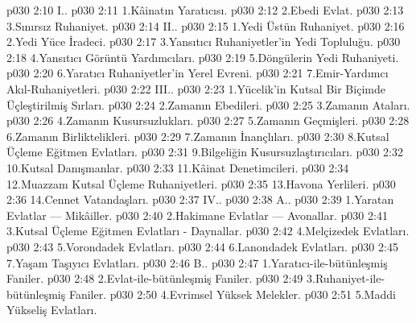 \vs p030 2:10 I.\bibnobreakspace {}.
\vs p030 2:11 1.\bibnobreakspace Kâinatın Yaratıcısı.
\vs p030 2:12 2.\bibnobreakspace Ebedi Evlat.
\vs p030 2:13 3.\bibnobreakspace Sınırsız Ruhaniyet.
\vs p030 2:14 II.\bibnobreakspace {}.
\vs p030 2:15 1.\bibnobreakspace Yedi Üstün Ruhaniyet.
\vs p030 2:16 2.\bibnobreakspace Yedi Yüce İradeci.
\vs p030 2:17 3.\bibnobreakspace Yansıtıcı Ruhaniyetler’in Yedi Topluluğu.
\vs p030 2:18 4.\bibnobreakspace Yansıtıcı Görüntü Yardımcıları.
\vs p030 2:19 5.\bibnobreakspace Döngülerin Yedi Ruhaniyeti.
\vs p030 2:20 6.\bibnobreakspace Yaratıcı Ruhaniyetler’in Yerel Evreni.
\vs p030 2:21 7.\bibnobreakspace Emir\hyp{}Yardımcı Akıl\hyp{}Ruhaniyetleri.
\vs p030 2:22 III.\bibnobreakspace {}.
\vs p030 2:23 1.\bibnobreakspace Yücelik’in Kutsal Bir Biçimde Üçleştirilmiş Sırları.
\vs p030 2:24 2.\bibnobreakspace Zamanın Ebedileri.
\vs p030 2:25 3.\bibnobreakspace Zamanın Ataları.
\vs p030 2:26 4.\bibnobreakspace Zamanın Kusursuzlukları.
\vs p030 2:27 5.\bibnobreakspace Zamanın Geçmişleri.
\vs p030 2:28 6.\bibnobreakspace Zamanın Birliktelikleri.
\vs p030 2:29 7.\bibnobreakspace Zamanın İnançlıları.
\vs p030 2:30 8.\bibnobreakspace Kutsal Üçleme Eğitmen Evlatları.
\vs p030 2:31 9.\bibnobreakspace Bilgeliğin Kusursuzlaştırıcıları.
\vs p030 2:32 10.\bibnobreakspace Kutsal Danışmanlar.
\vs p030 2:33 11.\bibnobreakspace Kâinat Denetimcileri.
\vs p030 2:34 12.\bibnobreakspace Muazzam Kutsal Üçleme Ruhaniyetleri.
\vs p030 2:35 13.\bibnobreakspace Havona Yerlileri.
\vs p030 2:36 14.\bibnobreakspace Cennet Vatandaşları.
\vs p030 2:37 IV.\bibnobreakspace {}.
\vs p030 2:38 A.\bibnobreakspace {}.
\vs p030 2:39 1.\bibnobreakspace Yaratan Evlatlar --- Mikâiller.
\vs p030 2:40 2.\bibnobreakspace Hakimane Evlatlar --- Avonallar.
\vs p030 2:41 3.\bibnobreakspace Kutsal Üçleme Eğitmen Evlatları \hyp{} Daynallar.
\vs p030 2:42 4.\bibnobreakspace Melçizedek Evlatları.
\vs p030 2:43 5.\bibnobreakspace Vorondadek Evlatları.
\vs p030 2:44 6.\bibnobreakspace Lanondadek Evlatları.
\vs p030 2:45 7.\bibnobreakspace Yaşam Taşıyıcı Evlatları.
\vs p030 2:46 B.\bibnobreakspace {}.
\vs p030 2:47 1.\bibnobreakspace Yaratıcı\hyp{}ile\hyp{}bütünleşmiş Faniler.
\vs p030 2:48 2.\bibnobreakspace Evlat\hyp{}ile\hyp{}bütünleşmiş Faniler.
\vs p030 2:49 3.\bibnobreakspace Ruhaniyet\hyp{}ile\hyp{}bütünleşmiş Faniler.
\vs p030 2:50 4.\bibnobreakspace Evrimsel Yüksek Melekler.
\vs p030 2:51 5.\bibnobreakspace Maddi Yükseliş Evlatları.
